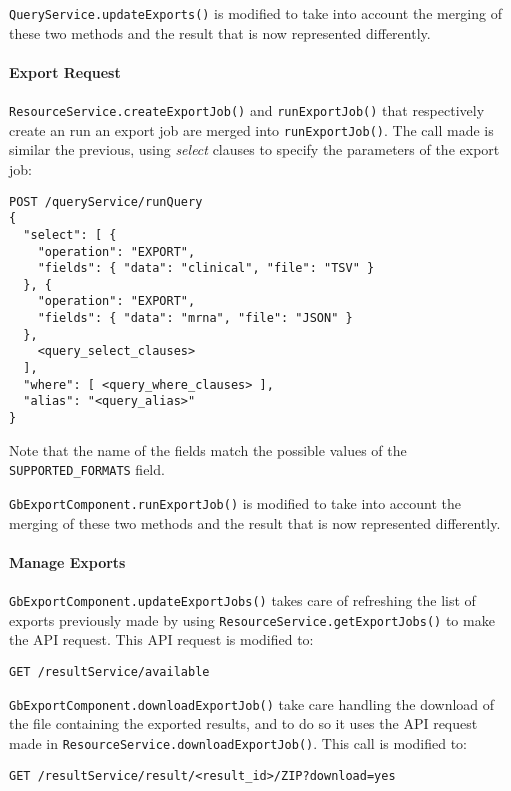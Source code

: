\verb|QueryService.updateExports()| is modified to take into account the merging of these two methods and the result that is now represented differently.

\paragraph{Export Request}

\verb|ResourceService.createExportJob()| and \verb|runExportJob()| that respectively create an run an export job are merged into \verb|runExportJob()|.
The call made is similar the previous, using \emph{select} clauses to specify the parameters of the export job:
\begin{verbatim}
POST /queryService/runQuery
{
  "select": [ {
    "operation": "EXPORT",
    "fields": { "data": "clinical", "file": "TSV" }
  }, {
    "operation": "EXPORT",
    "fields": { "data": "mrna", "file": "JSON" }
  }, 
    <query_select_clauses>
  ],
  "where": [ <query_where_clauses> ],
  "alias": "<query_alias>"
} 
\end{verbatim}

Note that the name of the fields match the possible values of the \verb|SUPPORTED_FORMATS| field.

\verb|GbExportComponent.runExportJob()| is modified to take into account the merging of these two methods and the result that is now represented differently.


\paragraph{Manage Exports}

\verb|GbExportComponent.updateExportJobs()| takes care of refreshing the list of exports previously made by using \verb|ResourceService.getExportJobs()| to make the API request.
This API request is modified to:
\begin{verbatim}
GET /resultService/available
\end{verbatim}

\verb|GbExportComponent.downloadExportJob()| take care handling the download of the file containing the exported results, and to do so it uses the API request made in \verb|ResourceService.downloadExportJob()|.
This call is modified to:
\begin{verbatim}
GET /resultService/result/<result_id>/ZIP?download=yes
\end{verbatim}

